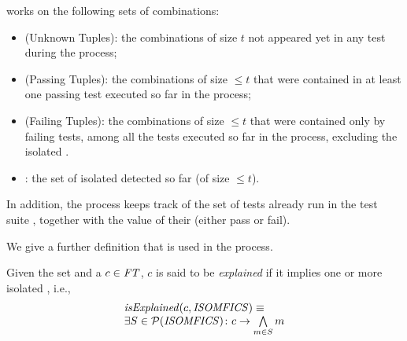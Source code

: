 \begin{tikzborder}{\cite{Gargantini16:validation}}
\begin{tikzborder}{\cite{gargantini_combinatorial_2017}}
\begin{tikzborder}{\cite{garn2019}}
\begin{tikzborder}{\cite{arcaini2019achieving}}
\begin{tikzborder}{}
\begin{algorithm}[!htb]
\begin{algorithmic}[1]
		\label{line:initUT}
		\EndWhile
	\end{algorithmic}
	\caption{\mixt}
	\label{alg:mixTgFlT}
\end{algorithm}

\mixt works on the following sets of combinations:
%
\begin{itemize}
	\item \textbf{\ut} (Unknown Tuples): the combinations of size $t$ not appeared yet in any test during the process;
	\item \textbf{\pt} (Passing Tuples): the combinations of size $\le t$ that were contained in at least one passing test executed so far in the process;
	\item \textbf{\ft} (Failing Tuples): the combinations of size $\le t$ that were contained only by failing tests, among all the tests executed so far in the process, excluding the isolated \mfics.
	\item \textbf{\isoMficsSet}: the set of isolated \mfics detected so far (of size $\le t$).
\end{itemize}
%
In addition, the process keeps track of the set of tests already run in the test suite \ts, together with the value of their \result (either pass or fail).

We give a further definition that is used in the process.

\begin{defn}\label{def:explainedFic}
	Given the set \isoMficsSet and a \fic $c \in \mathit{FT}$, $c$ is said to be \emph{explained} if it implies one or more isolated \mfics, i.e.,
	\[
	\begin{array}{l}
	\mathit{isExplained}(c, \mathit{ISOMFICS}) \equiv\\
	\exists S \in \mathcal{P}(\mathit{ISOMFICS}) \colon c \rightarrow \bigwedge\limits_{m \in S} m
	\end{array}
	\]
\end{defn}


\end{tikzborder}
\end{tikzborder}
\end{tikzborder}
\end{tikzborder}
\end{tikzborder}
